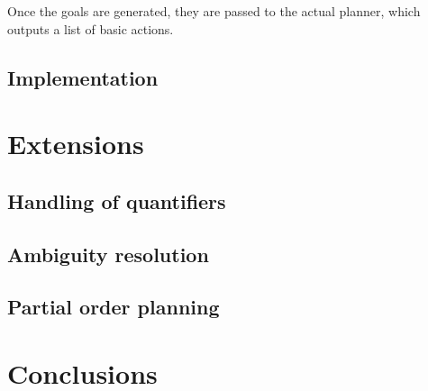 \documentclass[11pt]{article}
\begin{document}
	Once the goals are generated, they are passed to the actual planner, which 
	outputs a list of basic actions.

	\subsection{Implementation}


	\section{Extensions}

	\subsection{Handling of quantifiers}
	\subsection{Ambiguity resolution}
	\subsection{Partial order planning}

	\section{Conclusions}

	
	
\end{document}
